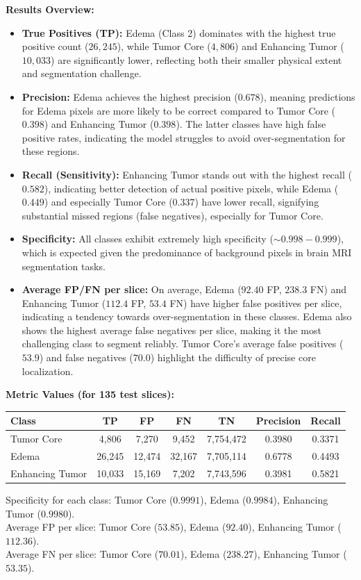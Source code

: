 \textbf{Results Overview:}
\begin{itemize}
    \item \textbf{True Positives (TP):} Edema (Class 2) dominates with the highest true positive count ($26,245$), while Tumor Core ($4,806$) and Enhancing Tumor ($10,033$) are significantly lower, reflecting both their smaller physical extent and segmentation challenge.
    
    \item \textbf{Precision:} Edema achieves the highest precision ($0.678$), meaning predictions for Edema pixels are more likely to be correct compared to Tumor Core ($0.398$) and Enhancing Tumor ($0.398$). The latter classes have high false positive rates, indicating the model struggles to avoid over-segmentation for these regions.
    
    \item \textbf{Recall (Sensitivity):} Enhancing Tumor stands out with the highest recall ($0.582$), indicating better detection of actual positive pixels, while Edema ($0.449$) and especially Tumor Core ($0.337$) have lower recall, signifying substantial missed regions (false negatives), especially for Tumor Core.
    
    \item \textbf{Specificity:} All classes exhibit extremely high specificity ($\sim0.998-0.999$), which is expected given the predominance of background pixels in brain MRI segmentation tasks.
    
    \item \textbf{Average FP/FN per slice:} On average, Edema ($92.40$ FP, $238.3$ FN) and Enhancing Tumor ($112.4$ FP, $53.4$ FN) have higher false positives per slice, indicating a tendency towards over-segmentation in these classes. Edema also shows the highest average false negatives per slice, making it the most challenging class to segment reliably. Tumor Core's average false positives ($53.9$) and false negatives ($70.0$) highlight the difficulty of precise core localization.
\end{itemize}

\textbf{Metric Values (for 135 test slices):}
\begin{center}
\begin{tabular}{lcccccc}
\toprule
\textbf{Class} & \textbf{TP} & \textbf{FP} & \textbf{FN} & \textbf{TN} & \textbf{Precision} & \textbf{Recall} \\
\midrule
Tumor Core       & 4,806  & 7,270   & 9,452   & 7,754,472 & 0.3980 & 0.3371 \\
Edema            & 26,245 & 12,474  & 32,167  & 7,705,114 & 0.6778 & 0.4493 \\
Enhancing Tumor  & 10,033 & 15,169  & 7,202   & 7,743,596 & 0.3981 & 0.5821 \\
\bottomrule
\end{tabular}
\end{center}
\noindent
Specificity for each class: Tumor Core ($0.9991$), Edema ($0.9984$), Enhancing Tumor ($0.9980$).\\
Average FP per slice: Tumor Core ($53.85$), Edema ($92.40$), Enhancing Tumor ($112.36$).\\
Average FN per slice: Tumor Core ($70.01$), Edema ($238.27$), Enhancing Tumor ($53.35$).

